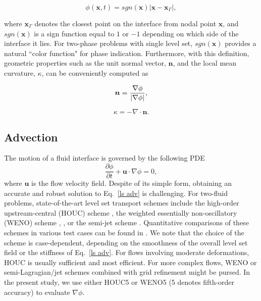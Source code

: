 \begin{equation}
    \phi({\bm x},t) = sgn({\bm x}) |{\bm x}-{\bm x_\Gamma}|,
  \label{dist ls}
\end{equation}

 \noindent where ${\bm x}_\Gamma$ denotes the closest point on the interface from nodal point ${\bm x}$, and $sgn({\bm x})$ is a sign function equal to $1$ or $-1$ depending on which side of the interface it lies. For two-phase problems with single level set, $sgn({\bm x})$ provides a natural ``color function" for phase indication. Furthermore, with this definition, geometric properties such as the unit normal vector, ${\bm n}$, and the local mean curvature, $\kappa$, can be conveniently computed as

\begin{equation}
    {\bm n} = \frac{\nabla \phi}{\lvert \nabla \phi \rvert},
  \label{normal}
\end{equation}

\begin{equation}
    \kappa = -\nabla \cdot {\bm n}.
  \label{curv}
\end{equation}




\subsection{Advection}
\label{ssubsec: ls adv}


The motion of a fluid interface is governed by the following PDE
\begin{equation}
  \frac{\partial \phi}{\partial t} + {\bm u} \cdot \nabla \phi = 0,
  \label{ls adv}
\end{equation}
where ${\bm u}$ is the flow velocity field. Despite of its simple form, obtaining an accurate and robust solution to Eq.\ \eqref{ls adv} is challenging. For two-fluid problems, state-of-the-art level set transport schemes include the high-order upstream-central (HOUC) scheme \cite{Nourgaliev_JCP_2007}, the weighted essentially non-oscillatory (WENO) scheme \cite{Liu_JCP_1994}, , or the semi-jet scheme \cite{Velmurugana_AX_2016}. Quantitative comparisons of these schemes in various test cases can be found in \cite{Nourgaliev_JCP_2007, Velmurugana_AX_2016}. We note that the choice of the scheme is case-dependent, \ie depending on the smoothness of the overall level set field or the stiffness of Eq.\ \eqref{ls adv}. For flows involving moderate deformations, HOUC is usually sufficient and most efficient. For more complex flows, WENO or semi-Lagragian/jet schemes combined with grid refinement might be pursed. In the present study, we use either HOUC5 or WENO5 (5 denotes fifth-order accuracy) to evaluate $\nabla \phi$.

